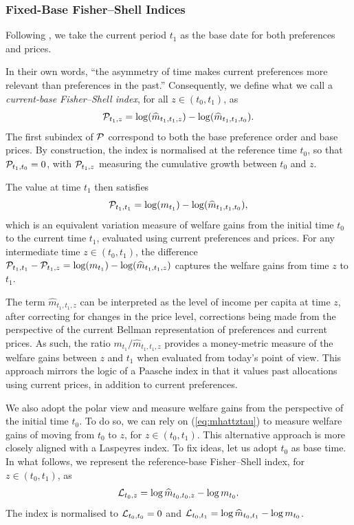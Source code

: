 \documentclass[12pt,a4paper]{article}
\begin{document}
\subsubsection{Fixed-Base Fisher–Shell Indices}

Following \cite{BB2023welfare}, we take the current period \( t_1 \) as the base date for both preferences and prices.

In their own words, “the asymmetry of time makes current preferences more relevant than preferences in the past.”
Consequently, we define what we call a {\it current-base Fisher–Shell index}, for all $z\in(t_0,t_1)$, as
\begin{equation}\label{eq:PFS}
{\cal P}_{t_1,z} = \log(\widehat{m}_{t_1,t_1,z}) - \log(\widehat{m}_{t_1,t_1, t_0}) .
\end{equation}  
The first subindex of ${\cal P}$ correspond to both the base preference order and base prices.  
By construction, the index is normalised at the reference time $t_0$, so that \( {\cal P}_{t_1,t_0} = 0 \), with \({\cal P}_{t_1,z}\) measuring the cumulative growth between \(t_0\) and \(z\).

The value at time \( t_1 \) then satisfies
\[
{\cal P}_{t_1,t_1} = \log(m_{t_1}) - \log(\widehat{m}_{t_1,t_1,t_0}),
\]
which is an equivalent variation measure of welfare gains from the initial time \( t_0 \) to the current time \( t_1 \), evaluated using current preferences and prices. For any intermediate time \( z \in (t_0, t_1) \), the difference \( {\cal P}_{t_1,t_1} - {\cal P}_{t_1,z} = \log(m_{t_1}) - \log(\widehat{m}_{t_1,t_1,z}) \) captures the welfare gains from time \( z \) to \( t_1 \).

The term \( \widehat{m}_{t_1,t_1,z} \) can be interpreted as the level of income per capita at time $z$, after correcting for changes in the price level, corrections being made from the perspective of the current Bellman representation of preferences and current prices. 
As such, the ratio \(  m_{t_1}  / \widehat{m}_{t_1,t_1,z} \) provides a money-metric measure of the welfare gains between $z$ and $t_1$ when evaluated from today's point of view. This approach mirrors the logic of a Paasche index in that it values past allocations using current prices, in addition to current preferences.

We also adopt the polar view and measure welfare gains from the perspective of the initial time $t_0$. To do so, we can rely on (\ref{eq:mhattztau}) to measure welfare gains of moving from $t_0$ to $z$, for $z\in(t_0,t_1)$. This alternative approach is more closely aligned with a Laspeyres index.
To fix ideas, let us adopt $t_0$ as base time.
In what follows, we represent the reference-base Fisher–Shell index, for $z \in(t_0, t_1)$, as 
\begin{equation}\label{eq:LFS}
{\cal L}_{t_0,z} =  \log\widehat m_{t_0,t_0,z} - \log m_{t_0}.
\end{equation}
The index is normalised to ${\cal L}_{t_0,t_0} = 0$ and ${\cal L}_{t_0,t_1} = \log \widehat m_{t_0,t_1} - \log m_{t_0}$.
\end{document}
